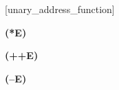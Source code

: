 \documentclass[12pt, a4paper]{article}
\newcommand{\syn}[1]{\textsf{#1}} %
\newcommand{\ail}[1]{\textsf{#1}} %
\begin{document}
    [unary\_address\_function]
    
{\bf (\syn{*E})} %
    
{\bf (\syn{++E})} %
    
    
{\bf (\syn{--E})} %
    
    
    
    
    
    
    
    
    
    
    
    
    
    
    
    
    
    
    
    
    
    







\end{document}
